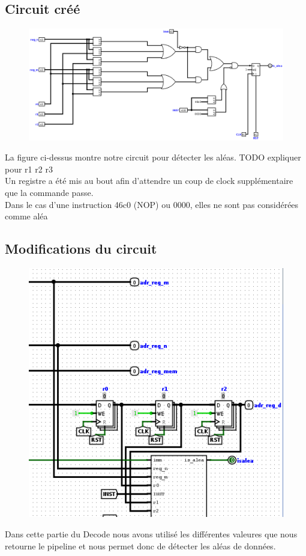 \documentclass[a4paper]{article} %
\begin{document}
\subsection{Circuit créé}
\begin{figure}[H]
   \centering
   \includegraphics[width=.8\textwidth]{src/ALEAS_jacta_est.png}
\end{figure}
La figure ci-dessus montre notre circuit pour détecter les aléas. TODO expliquer pour r1 r2 r3\\
Un registre a été mis au bout afin d'attendre un coup de clock supplémentaire que la commande passe.\\
Dans le cas d'une instruction 46c0 (NOP) ou 0000, elles ne sont pas considérées comme aléa

\subsection{Modifications du circuit}
\begin{figure}[H]
   \centering
   \includegraphics[width=.8\textwidth]{src/Decode_ALEAS.png}
\end{figure}
Dans cette partie du Decode nous avons utilisé les différentes valeures que nous retourne le pipeline et nous permet donc de détecter les aléas de données.
\end{document}

